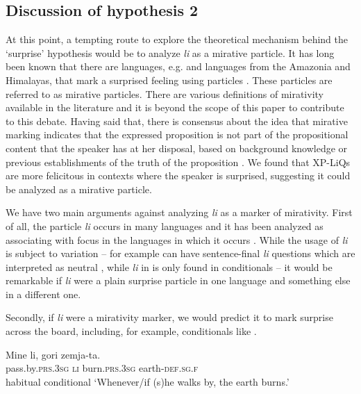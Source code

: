 \documentclass[output=paper]{langscibook}
\begin{document}
\subsection{Discussion of hypothesis 2}\label{sec:diss}
At this point, a tempting route to explore the theoretical mechanism behind the `surprise' hypothesis would be to analyze \textit{li} as a mirative particle. It has long been known that there are languages, e.g.  and languages from the Amazonia and Himalayas, that mark a surprised feeling using particles \citep{sudo2013,DeLancey2012}. These particles are referred to as mirative particles. There are various definitions of mirativity available in the literature and it is beyond the scope of this paper to contribute to this debate. Having said that, there is consensus about the idea that mirative marking indicates that the expressed proposition is not part of the propositional content that the speaker has at her disposal, based on background knowledge or previous establishments of the truth of the proposition \citep{DeLancey2012,Donabedian2001}. We found that XP-LiQs are more felicitous in contexts where the speaker is surprised, suggesting it could be analyzed as a mirative particle.

\begin{sloppypar}
We have two main arguments against analyzing \textit{li} as a marker of mirativity. %
First of all, the particle \textit{li} occurs in many  languages and it has been ana\-lyzed as associating with focus in the languages in which it occurs \citep{schwabe2004}. While the usage of \textit{li} is subject to variation -- for example  can have sentence-final \textit{li} questions which are interpreted as neutral \citep{dukova2010}, while \textit{li} in  is only found in conditionals \citep{schwabe2004} -- it would be remarkable if \textit{li} were a plain surprise particle in one  language and something else in a different one.
\end{sloppypar}

Secondly, if \textit{li} were a mirativity marker, we would predict it to mark surprise across the board, including, for example, conditionals like .


\ea \gll Mine li, gori zemja-ta. \\
pass.by.\textsc{prs.3sg} \textsc{li} burn.\textsc{prs.3sg} earth-\textsc{def.sg.f} \\ \hfill habitual conditional
\glt `Whenever/if (s)he walks by, the earth burns.'\hfill \citep[539]{koneski1987}\label{nosurprise}
\z
\end{document}
